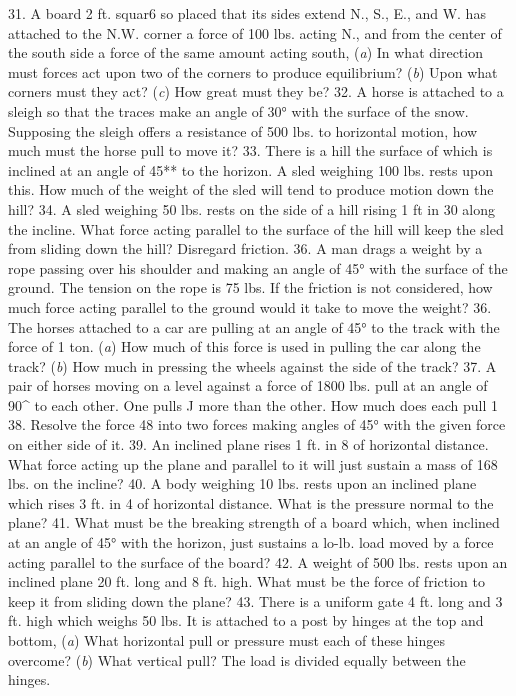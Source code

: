 31. A board 2 ft. squar6 so placed that its sides extend N., S., E., and W. has attached to the N.W. corner a force of 100 lbs. acting N., and from the center of the south side a force of the same amount acting south, (\emph{a}) In what direction must forces act upon two of the corners to produce equilibrium? (\emph{b}) Upon what corners must they act? (\emph{c}) How great must they be?
32. A horse is attached to a sleigh so that the traces make an angle of 30° with the surface of the snow. Supposing the sleigh offers a resistance of 500 lbs. to horizontal motion, how much must the horse pull to move it?
33. There is a hill the surface of which is inclined at an angle of 45** to the horizon. A sled weighing 100 lbs. rests upon this. How much of the weight of the sled will tend to produce motion down the hill?
34. A sled weighing 50 lbs. rests on the side of a hill rising 1 ft in 30 along the incline. What force acting parallel to the surface of the hill will keep the sled from sliding down the hill? Disregard friction.
36. A man drags a weight by a rope passing over his shoulder and making an angle of 45° with the surface of the ground. The tension on the rope is 75 lbs. If the friction is not considered, how much force acting parallel to the ground would it take to move the weight?
36. The horses attached to a car are pulling at an angle of 45° to the track with the force of 1 ton. (\emph{a}) How much of this force is used in pulling the car along the track? (\emph{b}) How much in pressing the wheels against the side of the track?
37. A pair of horses moving on a level against a force of 1800 lbs. pull at an angle of 90^ to each other. One pulls J more than the other. How much does each pull 1
38. Resolve the force 48 into two forces making angles of 45° with the given force on either side of it.
39. An inclined plane rises 1 ft. in 8 of horizontal distance. What force acting up the plane and parallel to it will just sustain a mass of 168 lbs. on the incline?
40. A body weighing 10 lbs. rests upon an inclined plane which rises 3 ft. in 4 of horizontal distance. What is the pressure normal to the plane?
41. What must be the breaking strength of a board which, when inclined at an angle of 45° with the horizon, just sustains a lo-lb. load moved by a force acting parallel to the surface of the board?
42. A weight of 500 lbs. rests upon an inclined plane 20 ft. long and 8 ft. high. What must be the force of friction to keep it from sliding down the plane?
43. There is a uniform gate 4 ft. long and 3 ft. high which weighs 50 lbs. It is attached to a post by hinges at the top and bottom, (\emph{a}) What horizontal pull or pressure must each of these hinges overcome? (\emph{b}) What vertical pull? The load is divided equally between the hinges.
